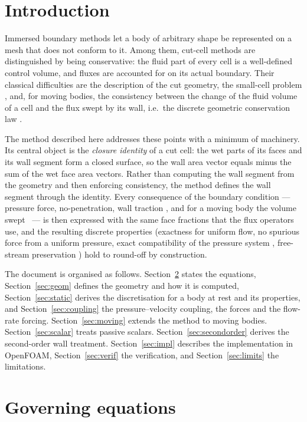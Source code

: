 \documentclass[11pt,a4paper]{article}
\theoremstyle{remark}
\begin{document}
\tableofcontents

\section{Introduction}

Immersed boundary methods let a body of arbitrary shape be represented on a mesh that does
not conform to it. Among them, cut-cell methods are distinguished by being conservative:
the fluid part of every cell is a well-defined control volume, and fluxes are accounted for on
its actual boundary. Their classical difficulties are the description of the cut geometry,
the small-cell problem%
, and, for moving bodies, the consistency between the change of the fluid
volume of a cell and the flux swept by its wall, i.e.\ the discrete geometric
conservation law%
.

The method described here addresses these points with a minimum of machinery. Its central
object is the \emph{closure identity} of a cut cell: the wet parts of its faces and its wall
segment form a closed surface, so the wall area vector equals minus the sum of the wet face
area vectors. Rather than computing the wall segment from the geometry and then enforcing
consistency, the method defines the wall segment through the identity. Every consequence of
the boundary condition --- pressure force, no-penetration, wall traction%
, and for a moving body the volume swept%
\ --- is then expressed with the same face fractions that the flux operators use, and the
resulting discrete properties (exactness for uniform flow, no spurious force from a uniform
pressure, exact compatibility of the pressure system%
, free-stream preservation%
) hold to round-off by construction.

The document is organised as follows. Section~\ref{sec:equations} states the equations,
Section~\ref{sec:geom} defines the geometry and how it is computed,
Section~\ref{sec:static} derives the discretisation for a body at rest and its properties,
and Section~\ref{sec:coupling} the pressure--velocity coupling, the forces and the flow-rate
forcing.
Section~\ref{sec:moving} extends the method to moving bodies.
Section~\ref{sec:scalar} treats passive scalars.
Section~\ref{sec:secondorder} derives the second-order wall treatment.
Section~\ref{sec:impl} describes the implementation in OpenFOAM, Section~\ref{sec:verif}
the verification, and Section~\ref{sec:limits} the limitations.

\section{Governing equations}
\label{sec:equations}
\end{document}

